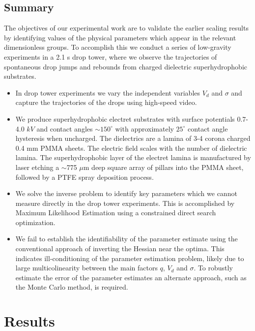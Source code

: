 \documentclass[12pt,a4paper,oneside]{book}
\begin{document}
\section{Summary}
The objectives of our experimental work are to validate the earlier scaling results by identifying values of the physical parameters which appear in the relevant dimensionless groups. To accomplish this we conduct a series of low-gravity experiments in a 2.1 s drop tower, where we observe the trajectories of spontaneous drop jumps and rebounds from charged dielectric superhydrophobic substrates.
\begin{itemize}
\item  In drop tower experiments we vary the independent variables $V_d$ and $\sigma$ and capture the trajectories of the drops using high-speed video. 
\item We produce superhydrophobic electret substrates with surface potentials 0.7-4.0 $kV$ and contact angles $\sim 150^{\circ}$ with approximately $25^{\circ}$ contact angle hysteresis when uncharged. The dielectrics are a lamina of 3-4 corona charged 0.4 mm PMMA sheets. The electric field scales with the number of dielectric lamina. The superhydrophobic layer of the electret lamina is manufactured by laser etching a $\sim$775 $\mu$m deep square array of pillars into the PMMA sheet, followed by a PTFE spray deposition process. 
\item We solve the inverse problem to identify key parameters which we cannot measure directly in the drop tower experiments. This is accomplished by Maximum Likelihood Estimation using a constrained direct search optimization.
\item We fail to establish the identifiability of the parameter estimate using the conventional approach of inverting the Hessian near the optima. This indicates ill-conditioning of the parameter estimation problem, likely due to large multicolinearity between the main factors $q$, $V_d$ and $\sigma$. To robustly estimate the error of the parameter estimates an alternate approach, such as the Monte Carlo method, is required.
\end{itemize}

\chapter{Results}
\end{document}
